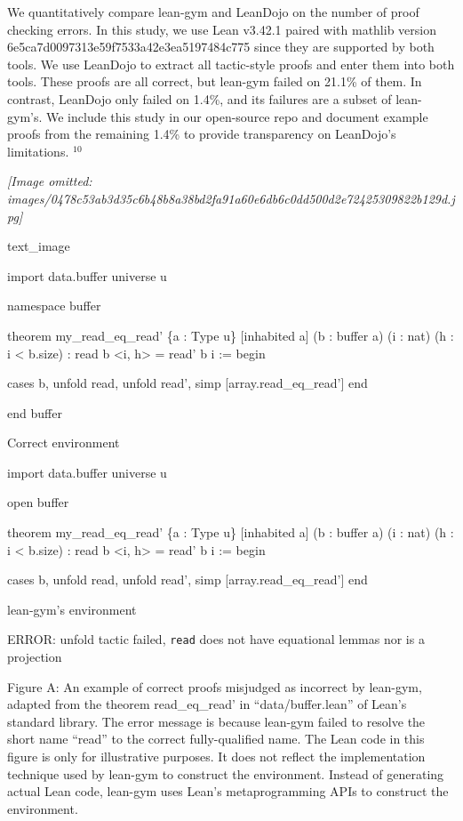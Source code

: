 \documentclass[
]{article}
\begin{document}
We quantitatively compare lean-gym and LeanDojo on the number of proof
checking errors. In this study, we use Lean v3.42.1 paired with mathlib
version 6e5ca7d0097313e59f7533a42e3ea5197484c775 since they are
supported by both tools. We use LeanDojo to extract all tactic-style
proofs and enter them into both tools. These proofs are all correct, but
lean-gym failed on 21.1\% of them. In contrast, LeanDojo only failed on
1.4\%, and its failures are a subset of lean-gym's. We include this
study in our open-source repo and document example proofs from the
remaining 1.4\% to provide transparency on LeanDojo's limitations.
\(^{10}\)

\textit{[Image omitted: images/0478c53ab3d35c6b48b8a38bd2fa91a60e6db6c0dd500d2e72425309822b129d.jpg]}

text\_image

import data.buffer universe u

namespace buffer

theorem my\_read\_eq\_read' \{a : Type u\} {[}inhabited a{]} (b : buffer
a) (i : nat) (h : i \textless{} b.size) : read b \textless i,
h\textgreater{} = read' b i := begin

cases b, unfold read, unfold read', simp {[}array.read\_eq\_read'{]} end

end buffer

Correct environment

import data.buffer universe u

open buffer

theorem my\_read\_eq\_read' \{a : Type u\} {[}inhabited a{]} (b : buffer
a) (i : nat) (h : i \textless{} b.size) : read b \textless i,
h\textgreater{} = read' b i := begin

cases b, unfold read, unfold read', simp {[}array.read\_eq\_read'{]} end

lean-gym's environment

ERROR: unfold tactic failed, \texttt{read} does not have equational
lemmas nor is a projection

Figure A: An example of correct proofs misjudged as incorrect by
lean-gym, adapted from the theorem read\_eq\_read' in
``data/buffer.lean'' of Lean's standard library. The error message is
because lean-gym failed to resolve the short name ``read'' to the
correct fully-qualified name. The Lean code in this figure is only for
illustrative purposes. It does not reflect the implementation technique
used by lean-gym to construct the environment. Instead of generating
actual Lean code, lean-gym uses Lean's metaprogramming APIs to construct
the environment.
\end{document}
